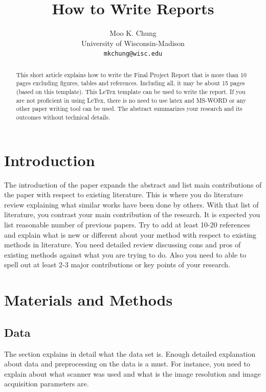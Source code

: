 \documentclass[12pt,portrait]{article}
\begin{document}

\title{How to Write Reports
}
\author{Moo K. Chung\\
University of Wisconsin-Madison\\
\quad \tt{mkchung@wisc.edu}}
\maketitle 

\begin{abstract}
This short article explains how to write the Final Project Report that is more than 10 pages excluding figures, tables and references. Including all, it may be about 15 pages  (based on this template). This LeTex template can be used to write the report.  If you are not proficient in using LeTex, there is no need to use latex and MS-WORD or any other paper writing tool can be used. The abstract summarizes your research and its outcomes without technical details. 
\end{abstract}

\section{Introduction}


The introduction of the paper expands the abstract and list main contributions of the paper with respect to existing literature. This is where you do literature review explaining what similar works have been done by others. With that list of literature, you contrast your main contribution of the research. It is expected you list reasonable number of previous papers. Try to add at least 10-20 references and explain what is new or different about your method with respect to existing methods in literature. You need detailed review discussing cons and pros of existing methods against what you are trying to do. Also you need to able to spell out at least 2-3 major contributions or key points of your research.



\section{Materials and Methods}

\subsection{Data} The section explains in detail what the data set is. Enough detailed explanation about data and preprocessing on the data is a must. For instance, you need to explain about what scanner was used and what is the image resolution and image acquisition parameters are. \\
\end{document}
